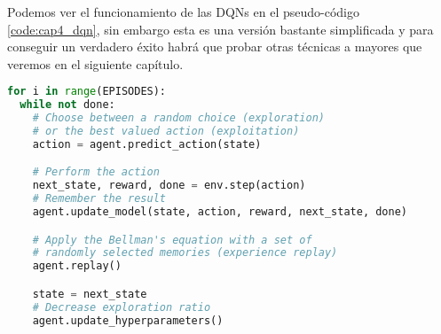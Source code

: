 Podemos ver el funcionamiento de las DQNs en el pseudo-código \ref{code:cap4_dqn}, sin embargo esta es una versión bastante simplificada y para conseguir un verdadero éxito habrá que probar otras técnicas a mayores que veremos en el siguiente capítulo.

\begin{minipage}{0.9\linewidth}%
\begin{lstlisting}[frame=tb, language=python, caption=Pseudocódigo DQN, inputencoding=latin1, label={code:cap4_dqn}]
for i in range(EPISODES):       
  while not done:  
    # Choose between a random choice (exploration)
    # or the best valued action (exploitation)
    action = agent.predict_action(state)

    # Perform the action
    next_state, reward, done = env.step(action)
    # Remember the result
    agent.update_model(state, action, reward, next_state, done)

    # Apply the Bellman's equation with a set of
    # randomly selected memories (experience replay)
    agent.replay()

    state = next_state
    # Decrease exploration ratio
    agent.update_hyperparameters()
\end{lstlisting}%
\end{minipage}
